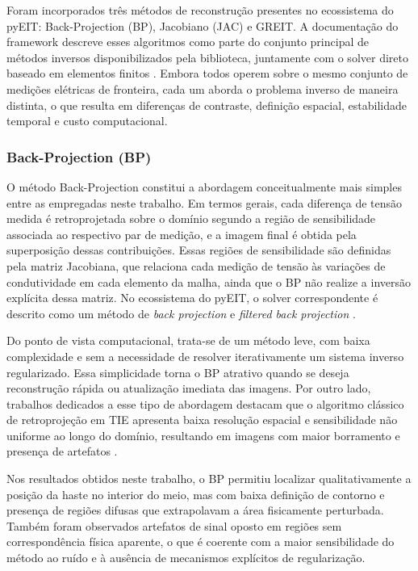 Foram incorporados três métodos de reconstrução presentes no ecossistema do pyEIT: Back-Projection (BP), Jacobiano (JAC) e GREIT. A documentação do framework descreve esses algoritmos como parte do conjunto principal de métodos inversos disponibilizados pela biblioteca, juntamente com o solver direto baseado em elementos finitos \cite{pyEITReadme}. Embora todos operem sobre o mesmo conjunto de medições elétricas de fronteira, cada um aborda o problema inverso de maneira distinta, o que resulta em diferenças de contraste, definição espacial, estabilidade temporal e custo computacional.

\subsubsection{Back-Projection (BP)}
\label{subsubsec:bp}

O método Back-Projection constitui a abordagem conceitualmente mais simples entre as empregadas neste trabalho. Em termos gerais, cada diferença de tensão medida é retroprojetada sobre o domínio segundo a região de sensibilidade associada ao respectivo par de medição, e a imagem final é obtida pela superposição dessas contribuições. Essas regiões de sensibilidade são definidas pela matriz Jacobiana, que relaciona cada medição de tensão às variações de condutividade em cada elemento da malha, ainda que o BP não realize a inversão explícita dessa matriz. No ecossistema do pyEIT, o solver correspondente é descrito como um método de \textit{back projection} e \textit{filtered back projection} \cite{pyEITReadme}.

Do ponto de vista computacional, trata-se de um método leve, com baixa complexidade e sem a necessidade de resolver iterativamente um sistema inverso regularizado. Essa simplicidade torna o BP atrativo quando se deseja reconstrução rápida ou atualização imediata das imagens. Por outro lado, trabalhos dedicados a esse tipo de abordagem destacam que o algoritmo clássico de retroprojeção em TIE apresenta baixa resolução espacial e sensibilidade não uniforme ao longo do domínio, resultando em imagens com maior borramento e presença de artefatos \cite{BarberBrown1984}.

Nos resultados obtidos neste trabalho, o BP permitiu localizar qualitativamente a posição da haste no interior do meio, mas com baixa definição de contorno e presença de regiões difusas que extrapolavam a área fisicamente perturbada. Também foram observados artefatos de sinal oposto em regiões sem correspondência física aparente, o que é coerente com a maior sensibilidade do método ao ruído e à ausência de mecanismos explícitos de regularização.

